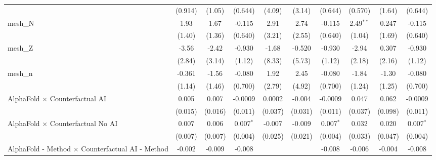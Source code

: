 \begin{tabular}{lccccccccc}
                                                               & (0.914)     & (1.05)        & (0.644)       & (4.09)   & (3.14)     & (0.644)       & (0.570)       & (1.64)        & (0.644)\\   
   mesh\_N                                                     & 1.93        & 1.67          & -0.115        & 2.91     & 2.74       & -0.115        & 2.49$^{**}$   & 0.247         & -0.115\\   
                                                               & (1.40)      & (1.36)        & (0.640)       & (3.21)   & (2.55)     & (0.640)       & (1.04)        & (1.69)        & (0.640)\\   
   mesh\_Z                                                     & -3.56       & -2.42         & -0.930        & -1.68    & -0.520     & -0.930        & -2.94         & 0.307         & -0.930\\   
                                                               & (2.84)      & (3.14)        & (1.12)        & (8.33)   & (5.73)     & (1.12)        & (2.18)        & (2.16)        & (1.12)\\   
   mesh\_n                                                     & -0.361      & -1.56         & -0.080        & 1.92     & 2.45       & -0.080        & -1.84         & -1.30         & -0.080\\   
                                                               & (1.14)      & (1.46)        & (0.700)       & (2.79)   & (4.92)     & (0.700)       & (1.24)        & (1.25)        & (0.700)\\   
   AlphaFold $\times$ Counterfactual AI                        & 0.005       & 0.007         & -0.0009       & 0.0002   & -0.004     & -0.0009       & 0.047         & 0.062         & -0.0009\\   
                                                               & (0.015)     & (0.016)       & (0.011)       & (0.037)  & (0.031)    & (0.011)       & (0.037)       & (0.098)       & (0.011)\\   
   AlphaFold $\times$ Counterfactual No AI                     & 0.007       & 0.006         & 0.007$^{*}$   & -0.007   & -0.009     & 0.007$^{*}$   & 0.032         & 0.020         & 0.007$^{*}$\\   
                                                               & (0.007)     & (0.007)       & (0.004)       & (0.025)  & (0.021)    & (0.004)       & (0.033)       & (0.047)       & (0.004)\\   
   AlphaFold - Method $\times$ Counterfactual AI - Method      & -0.002      & -0.009        & -0.008        &          &            & -0.008        & -0.006        & -0.004        & -0.008\\   

\end{tabular}
